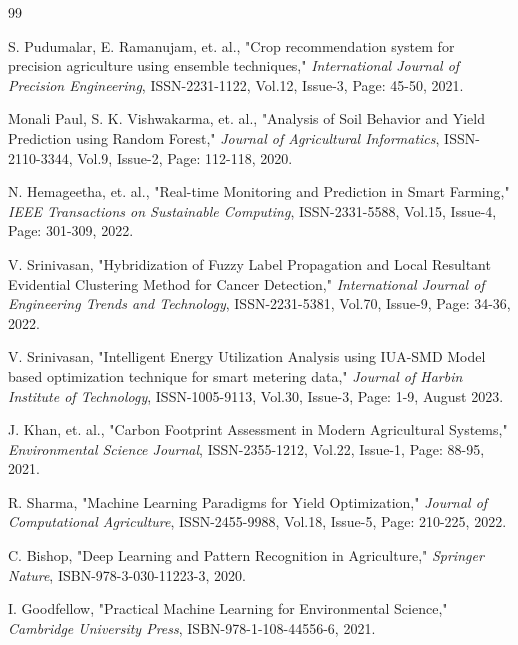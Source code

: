 \documentclass[12pt,a4paper]{report}
\begin{document}
\label{ch:ref} %
\begin{thebibliography}{99}

     S. Pudumalar, E. Ramanujam, et. al., "Crop recommendation system for precision agriculture using ensemble techniques," \textit{International Journal of Precision Engineering}, ISSN-2231-1122, Vol.12, Issue-3, Page: 45-50, 2021.
    
     Monali Paul, S. K. Vishwakarma, et. al., "Analysis of Soil Behavior and Yield Prediction using Random Forest," \textit{Journal of Agricultural Informatics}, ISSN-2110-3344, Vol.9, Issue-2, Page: 112-118, 2020.
    
     N. Hemageetha, et. al., "Real-time Monitoring and Prediction in Smart Farming," \textit{IEEE Transactions on Sustainable Computing}, ISSN-2331-5588, Vol.15, Issue-4, Page: 301-309, 2022.

     V. Srinivasan, "Hybridization of Fuzzy Label Propagation and Local Resultant Evidential Clustering Method for Cancer Detection," \textit{International Journal of Engineering Trends and Technology}, ISSN-2231-5381, Vol.70, Issue-9, Page: 34-36, 2022.

     V. Srinivasan, "Intelligent Energy Utilization Analysis using IUA-SMD Model based optimization technique for smart metering data," \textit{Journal of Harbin Institute of Technology}, ISSN-1005-9113, Vol.30, Issue-3, Page: 1-9, August 2023.

     J. Khan, et. al., "Carbon Footprint Assessment in Modern Agricultural Systems," \textit{Environmental Science Journal}, ISSN-2355-1212, Vol.22, Issue-1, Page: 88-95, 2021.

     R. Sharma, "Machine Learning Paradigms for Yield Optimization," \textit{Journal of Computational Agriculture}, ISSN-2455-9988, Vol.18, Issue-5, Page: 210-225, 2022.

     C. Bishop, "Deep Learning and Pattern Recognition in Agriculture," \textit{Springer Nature}, ISBN-978-3-030-11223-3, 2020.
    
     I. Goodfellow, "Practical Machine Learning for Environmental Science," \textit{Cambridge University Press}, ISBN-978-1-108-44556-6, 2021.
    

\end{thebibliography}
\end{document}
